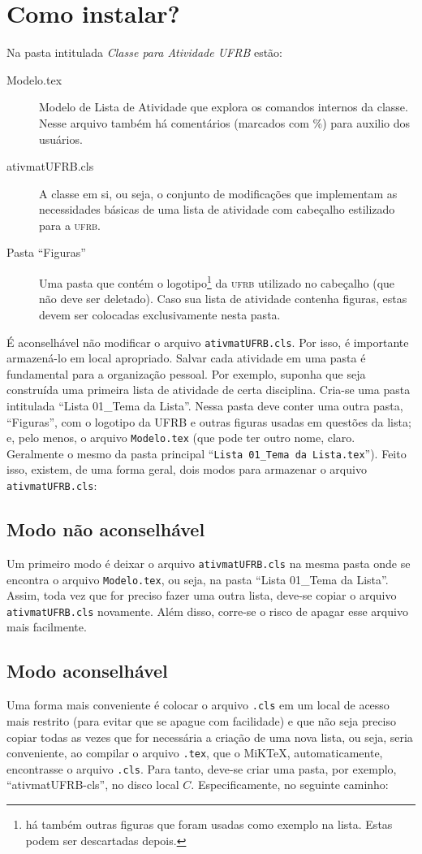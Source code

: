 \documentclass[a4paper]{article}
\begin{document}
\section{Como instalar?}
Na pasta intitulada \emph{Classe para Atividade UFRB} estão:
\begin{description}
\item[Modelo.tex] Modelo de Lista de Atividade que explora os comandos internos da classe. Nesse arquivo também há comentários (marcados com \%) para auxilio dos usuários.
\item[ativmatUFRB.cls] A classe em si, ou seja, o conjunto de modificações que implementam as necessidades básicas de uma lista de atividade com cabeçalho estilizado para a \textsc{ufrb}. 
\item[Pasta ``Figuras''] Uma pasta que contém o logotipo\footnote{há também outras figuras que foram usadas como exemplo na lista. Estas podem ser descartadas depois.} da \textsc{ufrb} utilizado no cabeçalho (que não deve ser deletado). Caso sua lista de atividade contenha figuras, estas devem ser colocadas exclusivamente nesta pasta.
\end{description}

É aconselhável não modificar o arquivo \texttt{ativmatUFRB.cls}. Por isso, é importante armazená-lo em local apropriado. Salvar cada atividade em uma pasta é fundamental para a organização pessoal. Por exemplo, suponha que seja construída uma primeira lista de atividade de certa disciplina. Cria-se uma pasta intitulada ``Lista 01\_Tema da Lista''. Nessa pasta deve conter uma outra pasta, ``Figuras'', com o logotipo da UFRB e outras figuras usadas em questões da lista; e, pelo menos, o arquivo \texttt{Modelo.tex} (que pode ter outro nome, claro. Geralmente o mesmo da pasta principal ``\texttt{Lista 01\_Tema da Lista.tex}''). Feito isso, existem, de uma forma geral, dois modos para armazenar o arquivo \texttt{ativmatUFRB.cls}:

\subsection{Modo não aconselhável}
Um primeiro modo é deixar o arquivo \texttt{ativmatUFRB.cls} na mesma pasta onde se encontra o arquivo \texttt{Modelo.tex}, ou seja, na pasta ``Lista 01\_Tema da Lista''. Assim, toda vez que for preciso fazer uma outra lista, deve-se copiar o arquivo \texttt{ativmatUFRB.cls} novamente. Além disso, corre-se o risco de apagar esse arquivo mais facilmente.
\subsection{Modo aconselhável}
Uma forma mais conveniente é colocar o arquivo \texttt{.cls} em um local de acesso mais restrito (para evitar que se apague com facilidade) e que não seja preciso copiar todas as vezes que for necessária a criação de uma nova lista, ou seja, seria conveniente, ao compilar o arquivo \texttt{.tex}, que o MiK\TeX, automaticamente, encontrasse o arquivo \texttt{.cls}. Para tanto, deve-se criar uma pasta, por exemplo, ``ativmatUFRB-cls'', no disco local $C$. Especificamente, no seguinte caminho:
\end{document}

